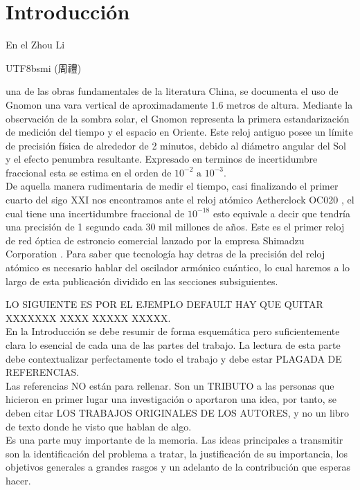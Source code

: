 \documentclass[11pt,a4paper,spanish]{book}
\begin{document}
\chapter{Introducción}
En el Zhou Li
\begin{CJK*}{UTF8}{bsmi}
(周禮)
\end{CJK*}
una de las obras fundamentales de la literatura China,  se documenta el uso de Gnomon \citep{biot1851tcheou} una vara vertical de aproximadamente 1.6 metros de altura. Mediante la observación de la sombra solar, el Gnomon representa la primera estandarización de medición del tiempo y el espacio en Oriente. Este reloj antiguo posee un límite de precisión física de alrededor de 2 minutos, debido al diámetro angular del Sol y el efecto penumbra resultante. Expresado en terminos de incertidumbre fraccional  \citep{eisenhart1963} esta se estima en el orden de $10^{-2} \text{ a } 10^{-3}$.\\
De aquella manera rudimentaria de medir el tiempo, casi finalizando el primer cuarto del sigo XXI nos encontramos ante el reloj atómico Aetherclock OC020 \citep{okaba2024optical}, el cual tiene una incertidumbre fraccional de $10^{-18}$ esto equivale a decir que tendría una precisión de 1 segundo cada 30 mil millones de años. Este es el primer reloj de red óptica de estroncio \citep{takamoto2003} comercial lanzado por la empresa Shimadzu Corporation \citep{shimadzu2025aetherclock}. Para saber que tecnología hay detras de la precisión del reloj atómico es necesario hablar del oscilador armónico cuántico, lo cual haremos a lo largo de esta publicación dividido en las secciones subsiguientes. 



LO SIGUIENTE ES POR EL EJEMPLO DEFAULT HAY QUE QUITAR XXXXXXX XXXX XXXXX XXXXX. \\

En la Introducción se debe resumir de forma esquemática pero suficientemente clara lo esencial de cada una de las partes del trabajo. La lectura de esta parte debe contextualizar perfectamente todo el trabajo y debe estar PLAGADA DE REFERENCIAS.\\

Las referencias NO están para rellenar. Son un TRIBUTO a las personas que hicieron en primer lugar una investigación o aportaron una idea, por tanto, se deben citar LOS TRABAJOS ORIGINALES DE LOS AUTORES, y no un libro de texto donde he visto que hablan de algo.\\

Es una parte muy importante de la memoria. Las ideas principales a transmitir son la identificación del problema a tratar, la justificación de su importancia, los objetivos generales a grandes rasgos y un adelanto de la contribución que esperas hacer.\\
\end{document}
